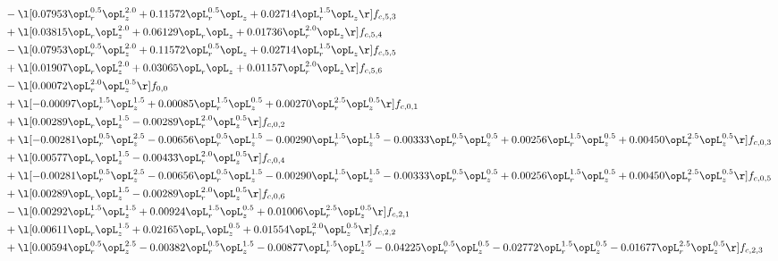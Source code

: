 \begin{alignat}{2}
& - \l[  0.07953 \opL_r^{0.5} \opL_z^{2.0} +  0.11572 \opL_r^{0.5} \opL_z +  0.02714 \opL_r^{1.5} \opL_z  \r] f_{c,5,3} \nonumber \\ 
& + \l[  0.03815 \opL_r \opL_z^{2.0} +  0.06129 \opL_r \opL_z +  0.01736 \opL_r^{2.0} \opL_z  \r] f_{c,5,4} \nonumber \\ 
& - \l[  0.07953 \opL_r^{0.5} \opL_z^{2.0} +  0.11572 \opL_r^{0.5} \opL_z +  0.02714 \opL_r^{1.5} \opL_z  \r] f_{c,5,5} \nonumber \\ 
& + \l[  0.01907 \opL_r \opL_z^{2.0} +  0.03065 \opL_r \opL_z +  0.01157 \opL_r^{2.0} \opL_z  \r] f_{c,5,6} \nonumber \\ 
& - \l[  0.00072 \opL_r^{2.0} \opL_z^{0.5}  \r] f_{0,0} \nonumber \\ 
& + \l[  -0.00097 \opL_r^{1.5} \opL_z^{1.5} +  0.00085 \opL_r^{1.5} \opL_z^{0.5} +  0.00270 \opL_r^{2.5} \opL_z^{0.5}  \r] f_{c,0,1} \nonumber \\ 
& + \l[  0.00289 \opL_r \opL_z^{1.5}   -0.00289 \opL_r^{2.0} \opL_z^{0.5}  \r] f_{c,0,2} \nonumber \\ 
& + \l[  -0.00281 \opL_r^{0.5} \opL_z^{2.5}   -0.00656 \opL_r^{0.5} \opL_z^{1.5}   -0.00290 \opL_r^{1.5} \opL_z^{1.5}   -0.00333 \opL_r^{0.5} \opL_z^{0.5} +  0.00256 \opL_r^{1.5} \opL_z^{0.5} +  0.00450 \opL_r^{2.5} \opL_z^{0.5}  \r] f_{c,0,3} \nonumber \\ 
& + \l[  0.00577 \opL_r \opL_z^{1.5}   -0.00433 \opL_r^{2.0} \opL_z^{0.5}  \r] f_{c,0,4} \nonumber \\ 
& + \l[  -0.00281 \opL_r^{0.5} \opL_z^{2.5}   -0.00656 \opL_r^{0.5} \opL_z^{1.5}   -0.00290 \opL_r^{1.5} \opL_z^{1.5}   -0.00333 \opL_r^{0.5} \opL_z^{0.5} +  0.00256 \opL_r^{1.5} \opL_z^{0.5} +  0.00450 \opL_r^{2.5} \opL_z^{0.5}  \r] f_{c,0,5} \nonumber \\ 
& + \l[  0.00289 \opL_r \opL_z^{1.5}   -0.00289 \opL_r^{2.0} \opL_z^{0.5}  \r] f_{c,0,6} \nonumber \\ 
& - \l[  0.00292 \opL_r^{1.5} \opL_z^{1.5} +  0.00924 \opL_r^{1.5} \opL_z^{0.5} +  0.01006 \opL_r^{2.5} \opL_z^{0.5}  \r] f_{c,2,1} \nonumber \\ 
& + \l[  0.00611 \opL_r \opL_z^{1.5} +  0.02165 \opL_r \opL_z^{0.5} +  0.01554 \opL_r^{2.0} \opL_z^{0.5}  \r] f_{c,2,2} \nonumber \\ 
& + \l[  0.00594 \opL_r^{0.5} \opL_z^{2.5}   -0.00382 \opL_r^{0.5} \opL_z^{1.5}   -0.00877 \opL_r^{1.5} \opL_z^{1.5}   -0.04225 \opL_r^{0.5} \opL_z^{0.5}   -0.02772 \opL_r^{1.5} \opL_z^{0.5}   -0.01677 \opL_r^{2.5} \opL_z^{0.5}  \r] f_{c,2,3} \nonumber \\ 

\end{alignat}
